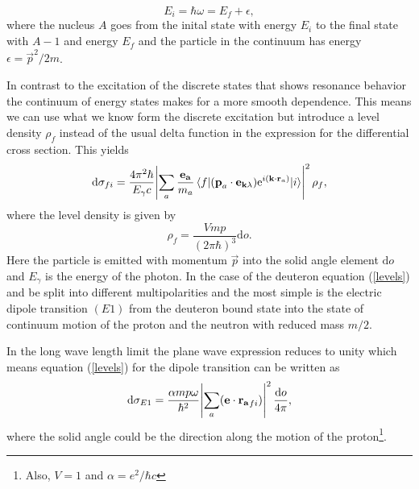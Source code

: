 \begin{equation}
    E_i = \hbar \omega = E_f + \epsilon,
\end{equation}
where the nucleus $A$ goes from the inital state with energy $E_i$ to the final state with $A-1$ and energy $E_f$ and the particle in the continuum has energy $\epsilon = \vec{p}^2/2m$. 

In contrast to the excitation of the discrete states that shows resonance behavior the continuum of energy states makes for a more smooth dependence. This means we can use what we know form the discrete excitation but introduce a level density $\rho_f$ instead of the usual delta function in the expression for the differential cross section. This yields
\begin{equation}\label{levels}
    \textrm{d}\sigma_{fi} = \frac{4\pi^2\hbar}{E_\gamma c}\abs{\sum_a \frac{\bm{\mathrm{e_a}}}{m_a}\mel{f}{(\bm{\mathrm{p}}_a\cdot \bm{\mathrm{e}}_{\bm{\mathrm{k}}\lambda})\textrm{e}^{i(\bm{\mathrm{k}}\cdot \bm{\mathrm{r}}_a)}}{i}}^2 \rho_f,
\end{equation}
where the level density is given by
\begin{equation}
    \rho_f = \frac{Vmp}{(2\pi\hbar)^3} \textrm{d}o.
\end{equation}
Here the particle is emitted with momentum $\vec{p}$ into the solid angle element $\textrm{d}o$ and $E_\gamma$ is the energy of the photon. In the case of the deuteron equation (\ref{levels}) and be split into different multipolarities and the most simple is the electric dipole transition $(E1)$ from the deuteron bound state into the state of continuum motion of the proton and the neutron with reduced mass $m/2$. 

In the long wave length limit the plane wave expression reduces to unity which means equation (\ref{levels}) for the dipole transition can be written as
\begin{equation} \label{diffE1}
    \textrm{d}\sigma_{E1} = \frac{\alpha mp\omega}{\hbar^2} \abs{\sum_a (\bm{\mathrm{e}}\cdot \bm{\mathrm{r_a}}_{fi})}^2 \frac{\textrm{d}o}{4\pi},
\end{equation}
where the solid angle could be the direction along the motion of the proton\footnote{Also, $V=1$ and $\alpha=e^2/\hbar c$}.

